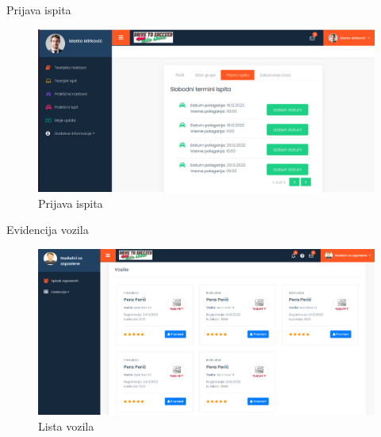 \documentclass[compress, containsverbatim,mathserif, xcolor=dvipsnames, unicode]{beamer}
\begin{document}
\begin{frame}{Prijava ispita}
        \begin{figure}[h!]
        \begin{center}
          \includegraphics[scale = 0.25]{UI_prijava_ispita.png}
        \end{center}
       \caption{Prijava ispita  }
    \end{figure}   
\end{frame}


\begin{frame}{Evidencija vozila}
        \begin{figure}[h!]
        \begin{center}
          \includegraphics[scale = 0.27]{UI_Nadlezni_za_zaposlene_vozila.png}
        \end{center}
       \caption{Lista vozila }
    \end{figure}   
\end{frame}
\end{document}
